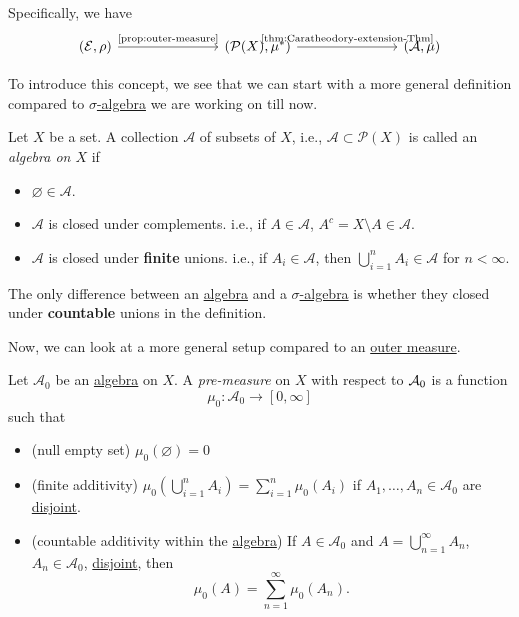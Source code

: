 Specifically, we have
\[
	\begin{tikzcd}
		(\mathcal{E}, \rho) \ar[rrr, "\text{\autoref{prop:outer-measure}}"] &&& (\mathcal{P}(X), \mu^{*} ) \ar[rrr, "\text{\autoref{thm:Caratheodory-extension-Thm}}"] &&& (\mathcal{A} , \mu)
	\end{tikzcd}
\]

\par To introduce this concept, we see that we can start with a more general definition compared to \hyperref[def:sigma-algebra]{\(\sigma\)-algebra} we are working on till now.
\begin{definition}[Algebra]\label{def:algebra}
	Let \(X\) be a set. A collection \(\mathcal{A} \) of subsets of \(X\), i.e., \(\mathcal{A}\subset \mathcal{P} (X) \) is called an \emph{algebra on \(X\)} if
	\begin{itemize}
		\item \(\varnothing \in \mathcal{A} \).
		\item \(\mathcal{A} \) is closed under complements. i.e., if \(A\in \mathcal{A} \), \(A^c = X\setminus A\in \mathcal{A} \).
		\item \(\mathcal{A} \) is closed under \textbf{finite} unions. i.e., if \(A_i\in \mathcal{A} \), then \(\bigcup\limits_{i=1}^{n} A_{i}\in \mathcal{A} \) for \(n<\infty \).
	\end{itemize}
\end{definition}
\begin{remark}
	The only difference between an \hyperref[def:algebra]{algebra} and a \hyperref[def:sigma-algebra]{\(\sigma\)-algebra} is whether they closed under \textbf{countable} unions in the definition.
\end{remark}

\par Now, we can look at a more general setup compared to an \hyperref[def:outer-measure]{outer measure}.
\begin{definition}\label{def:pre-measure}
	Let \(\mathcal{A} _0\) be an \hyperref[def:algebra]{algebra} on \(X\). A \emph{pre-measure} on \(X\) with respect to \(\mathcal{\MakeUppercase{a}} _0\) is a function
	\[
		\mu_0 \colon \mathcal{A} _0\to [0, \infty ]
	\]
	such that
	\begin{itemize}
		\item\label{def:pre-measure-null-empty-set}(null empty set) \(\mu_0(\varnothing ) = 0\)
		\item\label{def:pre-measure-finite-additivity}(finite additivity) \(\mu_0\left(\bigcup\limits_{i=1}^{n} A_{i}\right) = \sum\limits_{i=1}^{n} \mu_0(A_{i})\) if
		\(A_1, \ldots , A_n\in \mathcal{A} _0 \) are \underline{disjoint}.
		\item\label{def:pre-measure-countable-additivity-within-the-algebra}(countable additivity within the \hyperref[def:algebra]{algebra}) If \(A\in\mathcal{A} _0\) and \(A = \bigcup\limits_{n=1}^{\infty} A_{n}\),
		\(A_n\in\mathcal{A} _0\), \underline{disjoint}, then
		\[
			\mu_0(A) = \sum\limits_{n=1}^{\infty} \mu_0(A_{n}).
		\]
	\end{itemize}
\end{definition}

